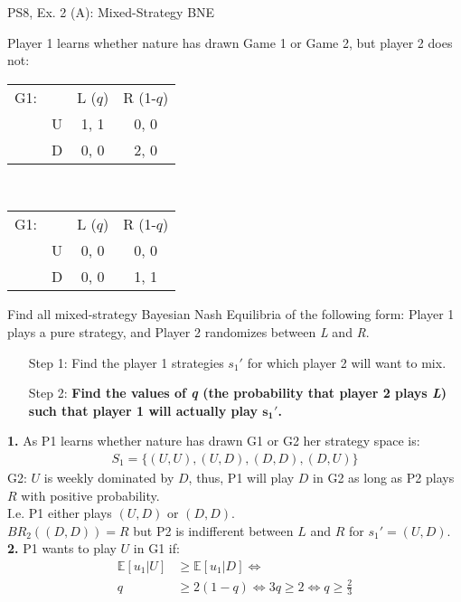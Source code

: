 \begin{frame}{PS8, Ex. 2 (A): Mixed-Strategy BNE}
    \begin{multicols}{2}
      Player 1 learns whether nature has drawn Game 1 or Game 2, but player 2 does not:
      \begin{table}
        \begin{tabular}{ll|c|c|}
          \multicolumn{1}{c}{G1:} & \multicolumn{1}{c}{} & \multicolumn{1}{c}{L ($q$)} & \multicolumn{1}{c}{R (1-$q$)} \\\cline{3-4}
          & U & 1, 1 & 0, 0 \\\cline{3-4}
          & D & 0, 0 & 2, 0 \\\cline{3-4}
        \end{tabular}\\\bigskip
        \begin{tabular}{ll|c|c|}
          \multicolumn{1}{c}{G1:} & \multicolumn{1}{c}{} & \multicolumn{1}{c}{L ($q$)} & \multicolumn{1}{c}{R (1-$q$)} \\\cline{3-4}
          & U & 0, 0 & 0, 0 \\\cline{3-4}
          & D & 0, 0 & 1, 1 \\\cline{3-4}
        \end{tabular}
      \end{table}
      Find all mixed-strategy Bayesian Nash Equilibria of the following form: Player 1 plays a pure strategy, and Player 2 randomizes between \textit{L} and \textit{R}.
      \begin{itemize}
        \item[Step 1:] Find the player 1 strategies $s_1'$ for which player 2 will want to mix.
        \item[Step 2:] \textbf{Find the values of \textit{q} (the probability that player 2 plays \textit{L}) such that player 1 will actually play $\bm{s_1'}$.}
      \end{itemize}
      \vfill\null\columnbreak
      \textbf{1.} As P1 learns whether nature has drawn G1 or G2 her strategy space is:
      \begin{align*}
        S_1=\{(U,U),(U,D),(D,D),(D,U)\}
      \end{align*}
      G2: $U$ is weekly dominated by $D$, thus, P1 will play $D$ in G2 as long as P2 plays $R$ with positive probability.\\\medskip I.e. P1 either plays $(U,D)$ or $(D,D)$.\\\medskip
      $BR_2((D,D))=R$ but P2 is indifferent between $L$ and $R$ for $s_1'=(U,D)$.\\\medskip
      \textbf{2.} P1 wants to play $U$ in G1 if:
      \begin{align*}
        \mathbb{E}[u_1|U]&\geq \mathbb{E}[u_1|D]\Leftrightarrow\\
        q&\geq2(1-q)\Leftrightarrow 3q\geq2 \Leftrightarrow q\geq\frac{2}{3}
      \end{align*}
      \vfill\null
    \end{multicols}
\end{frame}
